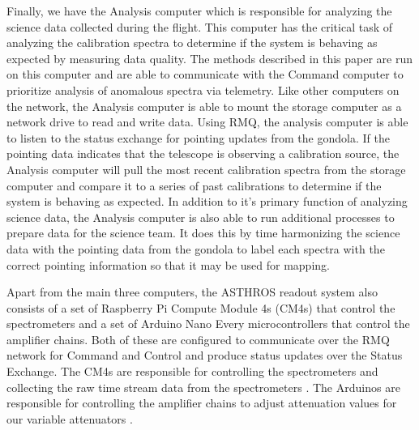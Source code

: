Finally, we have the Analysis computer which is responsible for analyzing the science data collected during the flight. 
This computer has the critical task of analyzing the calibration spectra to determine if the system is behaving as expected by measuring data quality. 
The methods described in this paper are run on this computer and are able to communicate with the Command computer to prioritize analysis of anomalous spectra via telemetry.
Like other computers on the network, the Analysis computer is able to mount the storage computer as a network drive to read and write data.
Using RMQ, the analysis computer is able to listen to the status exchange for pointing updates from the gondola.
If the pointing data indicates that the telescope is observing a calibration source, the Analysis computer will pull the most recent calibration spectra from the storage computer and compare it to a series of past calibrations to determine if the system is behaving as expected.
In addition to it's primary function of analyzing science data, the Analysis computer is also able to run additional processes to prepare data for the science team. 
It does this by time harmonizing the science data with the pointing data from the gondola to label each spectra with the correct pointing information so that it may be used for mapping. 

Apart from the main three computers, the ASTHROS readout system also consists of a set of Raspberry Pi Compute Module 4s (CM4s) that control the spectrometers and a set of Arduino Nano Every microcontrollers that control the amplifier chains. 
Both of these are configured to communicate over the RMQ network for Command and Control and produce status updates over the Status Exchange. 
The CM4s are responsible for controlling the spectrometers and collecting the raw time stream data from the spectrometers \parencite{mohammed2024digital}.
The Arduinos are responsible for controlling the amplifier chains to adjust attenuation values for our variable attenuators \parencite{Ricardo}.

